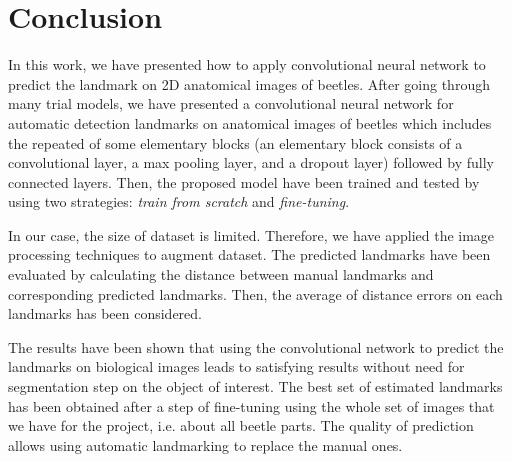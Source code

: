 \documentclass[review]{elsarticle}
\begin{document}
\pagebreak
\section{Conclusion}
\label{sconclusion}
In this work, we have presented how to apply convolutional neural network to predict the landmark on 2D anatomical images of beetles. After going through many trial models, we have presented a convolutional neural network for automatic detection landmarks on anatomical images of beetles which includes the repeated of some elementary blocks (an elementary block consists of a convolutional layer, a max pooling layer, and a dropout layer) followed by fully connected layers. Then, the proposed model have been trained and tested by using two strategies: \textit{train from scratch} and \textit{fine-tuning}. 

In our case, the size of dataset is limited. Therefore, we have applied the image processing techniques to augment dataset. The predicted landmarks have been evaluated by calculating the distance between manual landmarks and corresponding predicted landmarks. Then, the average of distance errors on each landmarks has been considered.

The results have been shown that using the convolutional network to predict the landmarks on biological images leads to satisfying results without need for segmentation step on the object of interest. The
best set of estimated landmarks has been obtained after a step
of fine-tuning using the whole set of images that we have for the
project, i.e. about all beetle parts. The quality of prediction allows using automatic landmarking to replace the manual ones.


\end{document}
